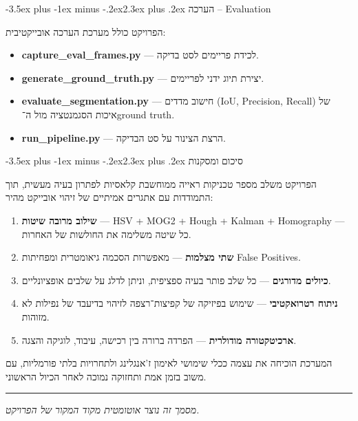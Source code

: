 \documentclass[12pt,a4paper]{article}
\makeatletter
\renewcommand{\section}{\@startsection{section}{1}{0pt}%
    {-3.5ex plus -1ex minus -.2ex}{2.3ex plus .2ex}%
    {\Large\bfseries\color{blue!50!black}}}
\makeatother
\begin{document}
\section{הערכה -- \textenglish{Evaluation}}

הפרויקט כולל מערכת הערכה אובייקטיבית:
\begin{itemize}[leftmargin=2em]
    \item \textbf{\textenglish{capture\_eval\_frames.py}} --- לכידת פריימים לסט בדיקה.
    \item \textbf{\textenglish{generate\_ground\_truth.py}} --- יצירת תיוג ידני לפריימים.
    \item \textbf{\textenglish{evaluate\_segmentation.py}} --- חישוב מדדים (\textenglish{IoU, Precision, Recall}) של איכות הסגמנטציה מול ה־\textenglish{ground truth}.
    \item \textbf{\textenglish{run\_pipeline.py}} --- הרצת הצינור על סט הבדיקה.
\end{itemize}

\section{סיכום ומסקנות}

הפרויקט משלב מספר טכניקות ראייה ממוחשבת קלאסיות לפתרון בעיה מעשית, תוך התמודדות עם אתגרים אמיתיים של זיהוי אובייקט מהיר:

\begin{enumerate}[leftmargin=2em]
    \item \textbf{שילוב מרובה שיטות} --- \textenglish{HSV + MOG2 + Hough + Kalman + Homography} --- כל שיטה משלימה את החולשות של האחרות.
    \item \textbf{שתי מצלמות} --- מאפשרות הסכמה גיאומטרית ומפחיתות \textenglish{False Positives}.
    \item \textbf{כיולים מדורגים} --- כל שלב פותר בעיה ספציפית, וניתן לדלג על שלבים אופציונליים.
    \item \textbf{ניתוח רטרואקטיבי} --- שימוש בפיזיקה של קפיצות־רצפה לזיהוי בדיעבד של נפילות לא מזוהות.
    \item \textbf{ארכיטקטורה מודולרית} --- הפרדה ברורה בין רכישה, עיבוד, לוגיקה והצגה.
\end{enumerate}

המערכת הוכיחה את עצמה ככלי שימושי לאימון ז'אנגלינג ולתחרויות בלתי פורמליות, עם משוב בזמן אמת ותחזוקה נמוכה לאחר הכיול הראשוני.

\vspace{2em}
\hrule
\vspace{1em}
\begin{center}
\textit{מסמך זה נוצר אוטומטית מקוד המקור של הפרויקט.}
\end{center}
\end{document}
